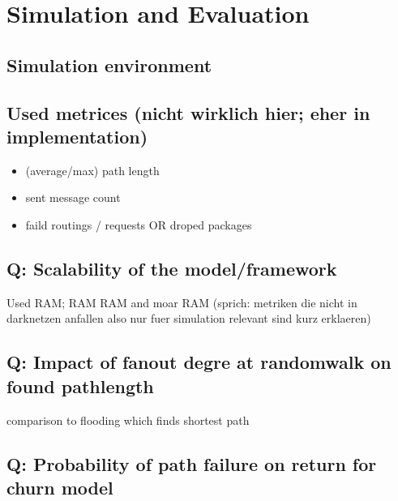 \chapter{Simulation and Evaluation}


\section{Simulation environment}
\section{Used metrices (nicht wirklich hier; eher in implementation)}
\begin{itemize}
\item        (average/max) path length
\item        sent message count
\item        faild routings / requests OR droped packages
\end{itemize}
\section{Q: Scalability of the model/framework}
        Used RAM; RAM RAM and moar RAM (sprich: metriken die nicht in darknetzen anfallen also nur fuer simulation relevant sind kurz erklaeren)
\section{Q: Impact of fanout degre at randomwalk on found pathlength}
        comparison to flooding which finds shortest path
\section{Q: Probability of path failure on return for churn model}

